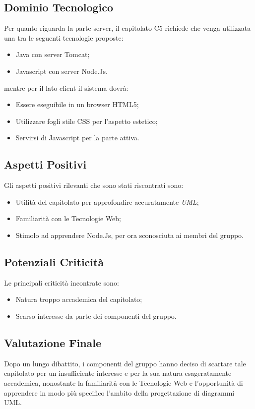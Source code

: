 \subsection{Dominio Tecnologico}
	Per quanto riguarda la parte server, il capitolato C5 richiede che venga utilizzata una tra le seguenti tecnologie proposte:
	\begin{itemize}
		\item Java con server Tomcat;
		\item Javascript con server Node.Js.
	\end{itemize}
	mentre per il lato client il sistema dovrà:
	\begin{itemize}
		\item Essere eseguibile in un browser HTML5;
		\item Utilizzare fogli stile CSS per l’aspetto estetico;
		\item Servirsi di Javascript per la parte attiva.
	\end{itemize}
	
\subsection{Aspetti Positivi}
	Gli aspetti positivi rilevanti che sono stati riscontrati sono:
	\begin{itemize}
		\item Utilità del capitolato per approfondire accuratamente \textit{UML};
		\item Familiarità con le Tecnologie Web;
		\item Stimolo ad apprendere Node.Js, per ora sconosciuta ai membri del gruppo.
	\end{itemize}

\subsection{Potenziali Criticità}
	Le principali criticità incontrate sono:
	\begin{itemize}
		\item Natura troppo accademica del capitolato;
		\item Scarso interesse da parte dei componenti del gruppo.
	\end{itemize}

\subsection{Valutazione Finale}
	Dopo un lungo dibattito, i componenti del gruppo hanno deciso di scartare tale capitolato per un insufficiente interesse e per la sua natura esageratamente accademica, nonostante la familiarità con le Tecnologie Web e l'opportunità di apprendere in modo più specifico l'ambito della progettazione di diagrammi UML. 
	
